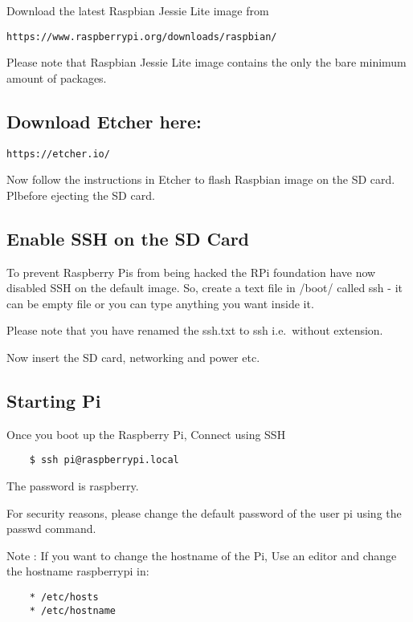 Download the latest Raspbian Jessie Lite image from

\begin{lstlisting}
https://www.raspberrypi.org/downloads/raspbian/
\end{lstlisting}

Please note that Raspbian Jessie Lite image contains the only the bare
minimum amount of packages.

\subsection{Download Etcher here:}

\begin{lstlisting}
https://etcher.io/
\end{lstlisting}

Now follow the instructions in Etcher to flash Raspbian image on the SD
card. Plbefore ejecting the SD card.

\subsection{Enable SSH on the SD Card}

To prevent Raspberry Pis from being hacked the RPi foundation have now
disabled SSH on the default image. So, create a text file in /boot/
called ssh - it can be empty file or you can type anything you want
inside it.

Please note that you have renamed the ssh.txt to ssh i.e.~without
extension.

Now insert the SD card, networking and power etc.

\subsection{Starting Pi}

Once you boot up the Raspberry Pi, Connect using SSH

\begin{lstlisting}
    $ ssh pi@raspberrypi.local
\end{lstlisting}

The password is raspberry.

For security reasons, please change the default password of the user pi
using the passwd command.

Note : If you want to change the hostname of the Pi, Use an editor and
change the hostname raspberrypi in:

\begin{lstlisting}
    * /etc/hosts
    * /etc/hostname
\end{lstlisting}


